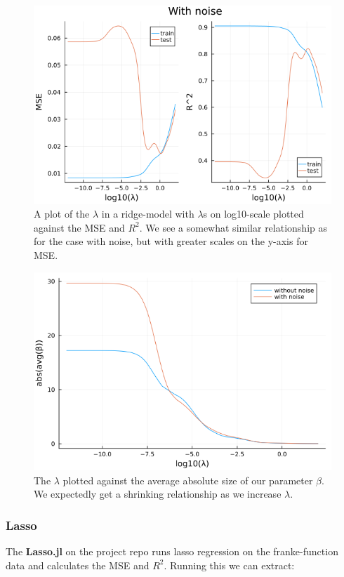 \documentclass{article}
\begin{document}
\begin{figure}
    \centerline{\includegraphics[scale=0.5]{ridge_with_noise}}
    \caption{A plot of the $\lambda$ in a ridge-model with $\lambda$s on log10-scale plotted against the MSE and $R^2$. We see a somewhat similar relationship as for the case with noise, but with greater scales on the y-axis for MSE.}
    \label{Ridge-no-noise}
\end{figure}

\begin{figure}
    \centerline{\includegraphics[scale=0.5]{ridge_beta_size}}
    \caption{The $\lambda$ plotted against the average absolute size of our parameter $\beta$. We expectedly get a shrinking relationship as we increase $\lambda$.}
    \label{Ridge-beta-sizes}
\end{figure}

\subsubsection{Lasso}
The \textbf{Lasso.jl} on the project repo \cite{githubrepoproject1} runs lasso
regression on the franke-function data and calculates the MSE and $R^2$. Running
this we can extract:
\end{document}
